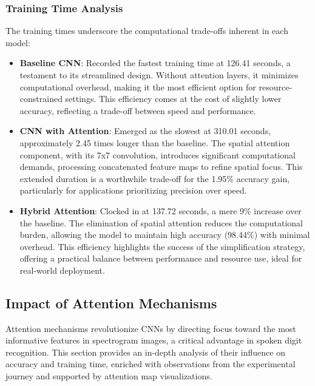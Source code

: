 \documentclass[12pt]{article}
\begin{document}
\subsubsection{Training Time Analysis}
The training times underscore the computational trade-offs inherent in each model:
\begin{itemize}
    \item \textbf{Baseline CNN}: Recorded the fastest training time at 126.41 seconds, a testament to its streamlined design. Without attention layers, it minimizes computational overhead, making it the most efficient option for resource-constrained settings. This efficiency comes at the cost of slightly lower accuracy, reflecting a trade-off between speed and performance.
    \item \textbf{CNN with Attention}: Emerged as the slowest at 310.01 seconds, approximately 2.45 times longer than the baseline. The spatial attention component, with its 7x7 convolution, introduces significant computational demands, processing concatenated feature maps to refine spatial focus. This extended duration is a worthwhile trade-off for the 1.95\% accuracy gain, particularly for applications prioritizing precision over speed.
    \item \textbf{Hybrid Attention}: Clocked in at 137.72 seconds, a mere 9\% increase over the baseline. The elimination of spatial attention reduces the computational burden, allowing the model to maintain high accuracy (98.44\%) with minimal overhead. This efficiency highlights the success of the simplification strategy, offering a practical balance between performance and resource use, ideal for real-world deployment.
\end{itemize}

\subsection{Impact of Attention Mechanisms}
Attention mechanisms revolutionize CNNs by directing focus toward the most informative features in spectrogram images, a critical advantage in spoken digit recognition. This section provides an in-depth analysis of their influence on accuracy and training time, enriched with observations from the experimental journey and supported by attention map visualizations.
\end{document}
